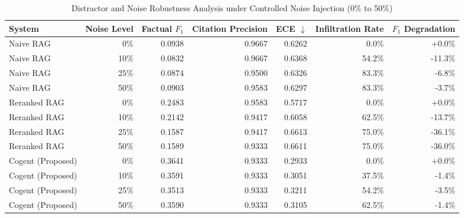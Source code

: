 \begin{table}[!t]
\centering
\caption{Distractor and Noise Robustness Analysis under Controlled Noise Injection (0\% to 50\%)}
\label{tab:noise_robustness}
\begin{tabular}{lrrrrrr}
\toprule
System & Noise Level & Factual $F_1$ & Citation Precision & ECE $\downarrow$ & Infiltration Rate & $F_1$ Degradation \\
\midrule
Naive RAG & 0\% & 0.0938 & 0.9667 & 0.6262 & 0.0\% & +0.0\% \\
Naive RAG & 10\% & 0.0832 & 0.9667 & 0.6368 & 54.2\% & -11.3\% \\
Naive RAG & 25\% & 0.0874 & 0.9500 & 0.6326 & 83.3\% & -6.8\% \\
Naive RAG & 50\% & 0.0903 & 0.9583 & 0.6297 & 83.3\% & -3.7\% \\
Reranked RAG & 0\% & 0.2483 & 0.9583 & 0.5717 & 0.0\% & +0.0\% \\
Reranked RAG & 10\% & 0.2142 & 0.9417 & 0.6058 & 62.5\% & -13.7\% \\
Reranked RAG & 25\% & 0.1587 & 0.9417 & 0.6613 & 75.0\% & -36.1\% \\
Reranked RAG & 50\% & 0.1589 & 0.9333 & 0.6611 & 75.0\% & -36.0\% \\
Cogent (Proposed) & 0\% & 0.3641 & 0.9333 & 0.2933 & 0.0\% & +0.0\% \\
Cogent (Proposed) & 10\% & 0.3591 & 0.9333 & 0.3051 & 37.5\% & -1.4\% \\
Cogent (Proposed) & 25\% & 0.3513 & 0.9333 & 0.3211 & 54.2\% & -3.5\% \\
Cogent (Proposed) & 50\% & 0.3590 & 0.9333 & 0.3105 & 62.5\% & -1.4\% \\
\bottomrule
\end{tabular}
\end{table}

